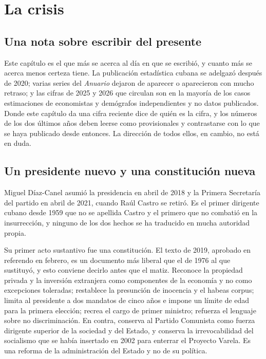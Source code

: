 \chapter{La crisis}
\label{ch:crisis}

\section{Una nota sobre escribir del presente}

Este capítulo es el que más se acerca al día en que se escribió, y cuanto más se
acerca menos certeza tiene. La publicación estadística cubana se adelgazó después
de 2020; varias series del \emph{Anuario} dejaron de aparecer o aparecieron con
mucho retraso; y las cifras de 2025 y 2026 que circulan son en la mayoría de los
casos estimaciones de economistas y demógrafos independientes y no datos
publicados. Donde este capítulo da una cifra reciente dice de quién es la cifra, y
los números de los dos últimos años deben leerse como provisionales y contrastarse
con lo que se haya publicado desde entonces. La dirección de todos ellos, en
cambio, no está en duda.

\section{Un presidente nuevo y una constitución nueva}

Miguel Díaz-Canel asumió la presidencia en abril de 2018 y la Primera Secretaría
del partido en abril de 2021, cuando Raúl Castro se retiró. Es el primer dirigente
cubano desde 1959 que no se apellida Castro y el primero que no combatió en la
insurrección, y ninguno de los dos hechos se ha traducido en mucha autoridad
propia.

Su primer acto sustantivo fue una constitución. El texto de 2019, aprobado en
referendo en febrero, es un documento más liberal que el de 1976 al que sustituyó,
y esto conviene decirlo antes que el matiz. Reconoce la propiedad privada y la
inversión extranjera como componentes de la economía y no como excepciones
toleradas; restablece la presunción de inocencia y el habeas corpus; limita al
presidente a dos mandatos de cinco años e impone un límite de edad para la primera
elección; recrea el cargo de primer ministro; refuerza el lenguaje sobre no
discriminación. En contra, conserva al Partido Comunista como fuerza dirigente
superior de la sociedad y del Estado, y conserva la irrevocabilidad del socialismo
que se había insertado en 2002 para enterrar el Proyecto Varela. Es una reforma de
la administración del Estado y no de su política.

